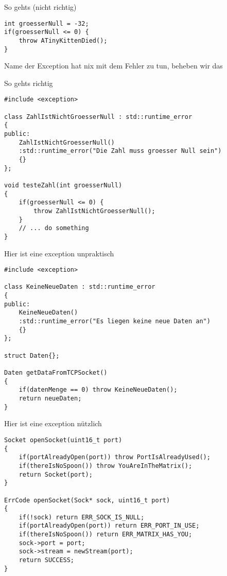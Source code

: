 \begin{frame}[fragile]{So gehts (nicht richtig)}
	\begin{lstlisting}[]
int groesserNull = -32;
if(groesserNull <= 0) {
	throw ATinyKittenDied();
}
	\end{lstlisting}

Name der Exception hat nix mit dem Fehler zu tun, beheben wir das

\end{frame}
\begin{frame}[fragile]{So gehts richtig}
	\begin{lstlisting}[]
#include <exception>

class ZahlIstNichtGroesserNull : std::runtime_error
{
public:
	ZahlIstNichtGroesserNull()
	:std::runtime_error("Die Zahl muss groesser Null sein")
	{}
};

void testeZahl(int groesserNull)
{
	if(groesserNull <= 0) {
		throw ZahlIstNichtGroesserNull();
	}
	// ... do something
}
	\end{lstlisting}

\end{frame}

\begin{frame}[fragile]{Hier ist eine exception unpraktisch}
	\begin{lstlisting}[]
#include <exception>

class KeineNeueDaten : std::runtime_error
{
public:
	KeineNeueDaten()
	:std::runtime_error("Es liegen keine neue Daten an")
	{}
};

struct Daten{};

Daten getDataFromTCPSocket()
{
	if(datenMenge == 0) throw KeineNeueDaten();
	return neueDaten;
}
	\end{lstlisting}

\end{frame}

\begin{frame}[fragile]{Hier ist eine exception nützlich}
	\begin{lstlisting}[]
Socket openSocket(uint16_t port)
{
	if(portAlreadyOpen(port)) throw PortIsAlreadyUsed();
	if(thereIsNoSpoon()) throw YouAreInTheMatrix();
	return Socket(port);
}

ErrCode openSocket(Sock* sock, uint16_t port)
{
	if(!sock) return ERR_SOCK_IS_NULL;
	if(portAlreadyOpen(port)) return ERR_PORT_IN_USE;
	if(thereIsNoSpoon()) return ERR_MATRIX_HAS_YOU;
	sock->port = port;
	sock->stream = newStream(port);
	return SUCCESS;
}
	\end{lstlisting}

\end{frame}
